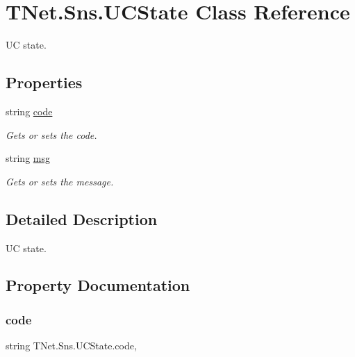 \hypertarget{class_t_net_1_1_sns_1_1_u_c_state}{}\section{T\+Net.\+Sns.\+U\+C\+State Class Reference}
\label{class_t_net_1_1_sns_1_1_u_c_state}


UC state.  


\subsection*{Properties}
\begin{DoxyCompactItemize}
\item 
string \mbox{\hyperlink{class_t_net_1_1_sns_1_1_u_c_state_a76b40dcdbc24446e3a84e8f43da237a6}{code}}
\begin{DoxyCompactList}\small\item\em Gets or sets the code. \end{DoxyCompactList}\item 
string \mbox{\hyperlink{class_t_net_1_1_sns_1_1_u_c_state_a945c75079f800f326cf231d96c17c4ed}{msg}}
\begin{DoxyCompactList}\small\item\em Gets or sets the message. \end{DoxyCompactList}\end{DoxyCompactItemize}


\subsection{Detailed Description}
UC state. 



\subsection{Property Documentation}
\mbox{\label{class_t_net_1_1_sns_1_1_u_c_state_a76b40dcdbc24446e3a84e8f43da237a6}} 
\subsubsection{\texorpdfstring{code}{code}}
{\footnotesize\ttfamily string T\+Net.\+Sns.\+U\+C\+State.\+code\hspace{0.3cm}{\ttfamily [get]}, {\ttfamily [set]}}



